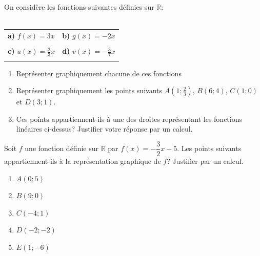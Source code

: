 \begin{exercice}
On considère les fonctions suivantes définies sur $\mathbb{R}$:\\\\
\begin{tabular}{p{4cm}p{4cm}}
\textbf{a)} $f(x)=3x$   &   \textbf{b)} $g(x)=-2x$    \\\\
\textbf{c)} $u(x)=\displaystyle\frac{2}{3}x$    &  \textbf{d)} $v(x)=\displaystyle-\frac{3}{7}x$    \\\\
\end{tabular} 
\begin{enumerate}
\item Représenter graphiquement chacune de ces fonctions
\item Représenter graphiquement les points suivants $A\left( 1;\frac{2}{3}\right) $, $B(6;4)$, $C(1;0)$ et $D(3;1)$.
\item Ces points appartiennent-ils à une des droites représentant les fonctions linéaires ci-dessus? Justifier votre réponse par un calcul.
\end{enumerate}
\end{exercice}

\begin{exercice}
Soit $f$ une fonction définie sur $\mathbb{R}$ par $f(x)=-\dfrac{3}{2}x-5$. Les points suivants appartiennent-ils à la représentation graphique de $f$? Justifier par un calcul.
\setlength{\columnseprule}{0pt}
\begin{multicols}{2}
\begin{enumerate}
\item $A(0;5)$
\item $B(9;0)$
\item $C(-4;1)$
\item $D(-2;-2)$
\item $E(1;-6)$
\end{enumerate}
\end{multicols}
\end{exercice}

